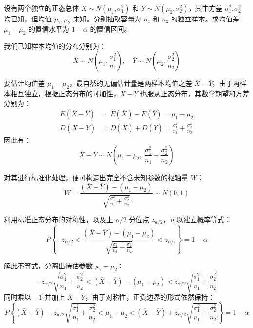 ﻿\documentclass[lang=cn,11pt]{elegantbook}
\begin{document}
\begin{exercise} \label{ex:ci_diff_mu_known_var}
设有两个独立的正态总体 $X \sim N(\mu_1, \sigma_1^2)$ 和 $Y \sim N(\mu_2, \sigma_2^2)$，其中方差 $\sigma_1^2, \sigma_2^2$ 均已知，但均值 $\mu_1, \mu_2$ 未知。分别抽取容量为 $n_1$ 和 $n_2$ 的独立样本。求均值差 $\mu_1-\mu_2$ 的置信水平为 $1-\alpha$ 的置信区间。
\end{exercise}

\begin{solution}
我们已知样本均值的分布分别为：
\begin{equation*}
\overline{X} \sim N\left(\mu_1, \frac{\sigma_1^2}{n_1}\right), \quad \overline{Y} \sim N\left(\mu_2, \frac{\sigma_2^2}{n_2}\right)
\end{equation*}

要估计均值差 $\mu_1-\mu_2$，最自然的无偏估计量是两样本均值之差 $\overline{X}-\overline{Y}$。由于两样本相互独立，根据正态分布的可加性，$\overline{X}-\overline{Y}$ 也服从正态分布，其数学期望和方差分别为：
\begin{align*}
E(\overline{X}-\overline{Y}) &= E(\overline{X}) - E(\overline{Y}) = \mu_1 - \mu_2 \\
D(\overline{X}-\overline{Y}) &= D(\overline{X}) + D(\overline{Y}) = \frac{\sigma_1^2}{n_1} + \frac{\sigma_2^2}{n_2}
\end{align*}
因此有：
\begin{equation*}
\overline{X}-\overline{Y} \sim N\left(\mu_1-\mu_2,\ \frac{\sigma_1^2}{n_1} + \frac{\sigma_2^2}{n_2}\right)
\end{equation*}

对其进行标准化处理，便可构造出完全不含未知参数的枢轴量 $W$：
\begin{equation*}
W = \frac{(\overline{X}-\overline{Y}) - (\mu_1-\mu_2)}{\sqrt{\frac{\sigma_1^2}{n_1} + \frac{\sigma_2^2}{n_2}}} \sim N(0,1)
\end{equation*}

利用标准正态分布的对称性，以及上 $\alpha/2$ 分位点 $z_{\alpha/2}$，可以建立概率等式：
\begin{equation*}
P\left\{-z_{\alpha/2} < \frac{(\overline{X}-\overline{Y}) - (\mu_1-\mu_2)}{\sqrt{\frac{\sigma_1^2}{n_1} + \frac{\sigma_2^2}{n_2}}} < z_{\alpha/2}\right\} = 1-\alpha
\end{equation*}

解此不等式，分离出待估参数 $\mu_1-\mu_2$：
\begin{equation*}
-z_{\alpha/2}\sqrt{\frac{\sigma_1^2}{n_1} + \frac{\sigma_2^2}{n_2}} < (\overline{X}-\overline{Y}) - (\mu_1-\mu_2) < z_{\alpha/2}\sqrt{\frac{\sigma_1^2}{n_1} + \frac{\sigma_2^2}{n_2}}
\end{equation*}
同时乘以 $-1$ 并加上 $\overline{X}-\overline{Y}$，由于对称性，正负边界的形式依然保持：
\begin{equation*}
P\left\{(\overline{X}-\overline{Y}) - z_{\alpha/2}\sqrt{\frac{\sigma_1^2}{n_1} + \frac{\sigma_2^2}{n_2}} < \mu_1-\mu_2 < (\overline{X}-\overline{Y}) + z_{\alpha/2}\sqrt{\frac{\sigma_1^2}{n_1} + \frac{\sigma_2^2}{n_2}}\right\} = 1-\alpha
\end{equation*}


\end{solution}
\end{document}
